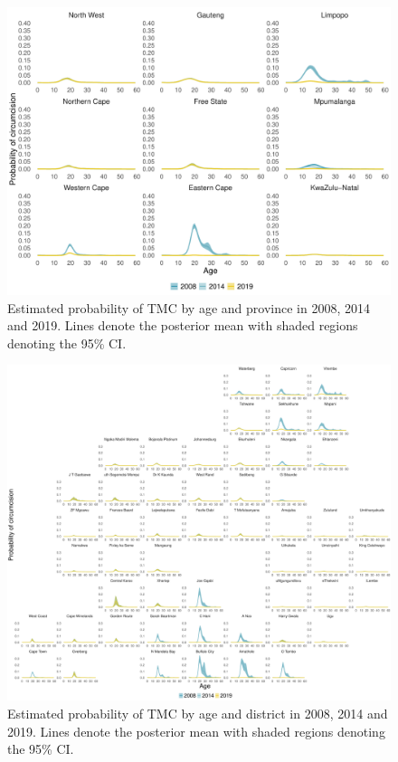 \documentclass{article}
\begin{document}
\begin{appendix}
\begin{figure}[H]
	\centering
	\includegraphics[width = \linewidth]{Figures/suppmat/Rates/ProbabilityofTMC_SingleAge_Province.pdf}
	\caption{Estimated probability of TMC by age and province in 2008, 2014 and 2019. Lines denote the posterior mean with shaded regions denoting the 95\% CI.}
\end{figure}


\begin{figure}[H]
	\centering
	\includegraphics[width = \linewidth]{Figures/suppmat/Rates/ProbabilityofTMC_SingleAge_District.pdf}
	\caption{Estimated probability of TMC by age and district in 2008, 2014 and 2019. Lines denote the posterior mean with shaded regions denoting the 95\% CI.}
\end{figure}


\end{appendix}
\end{document}
